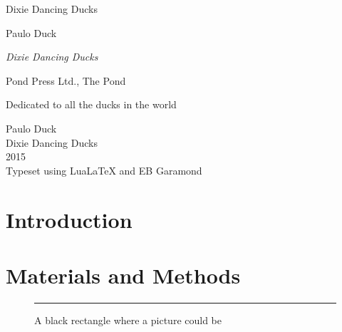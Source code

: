 \documentclass{scrbook}
\begin{document}
\begin{titlepage}
	\setlength{\parindent}{0pt}
	\centering  Dixie Dancing Ducks\par
\end{titlepage}
\begin{titlepage}
	\centering
	\vspace*{.15\textheight}
	{\Large{} Paulo Duck\par}
	\vspace*{.15\textheight}
	{\itshape\Huge Dixie Dancing Ducks\par}
	\vfill
	\par
	Pond Press Ltd., The Pond
	\vspace{.05\textheight}
\end{titlepage}
	Dedicated to all the ducks in the world\par
	\vfill
	\thispagestyle{empty}
	\begin{flushleft}
		Paulo Duck\\
		Dixie Dancing Ducks\\
		2015\\
		Typeset using LuaLaTeX and EB Garamond\\
	\end{flushleft}
\tableofcontents
\chapter{Introduction}
\blindtext

\blindtext

\blindtext




\chapter{Materials and Methods}
 \blindtext

\begin{figure}[b]
	\centering
	\rule{.6\linewidth}{3cm}
\caption{A black rectangle where a picture could be}
\end{figure}
\blindtext

\blindtext[4]
\end{document}
